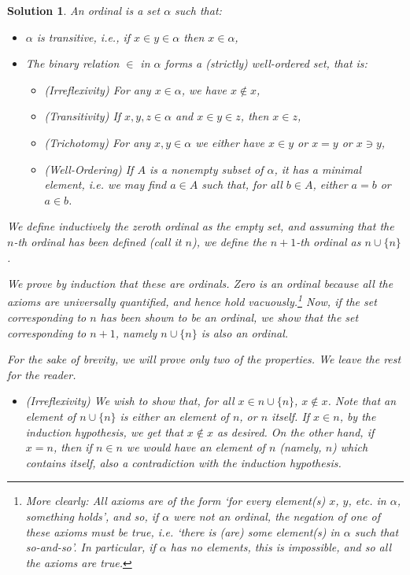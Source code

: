 \documentclass{article}
\theoremstyle{nonumberplain}
\newtheorem{sol}{Solution}
\begin{document}
\begin{sol}
An ordinal is a set $\alpha$ such that:
\begin{itemize}
\item $\alpha$ is transitive, i.e., if $x \in y \in \alpha$ then $x \in \alpha$,
\item The binary relation $\in$ in $\alpha$ forms a (strictly) well-ordered set, that is:
\begin{itemize}
\item (Irreflexivity) For any $x \in \alpha$, we have $x \notin x$,
\item (Transitivity) If $x,y,z \in \alpha$ and $x \in y \in z$, then $x \in z$,
\item (Trichotomy) For any $x, y \in \alpha$ we either have $x \in y$ or $x = y$ or $x \ni y$,
\item (Well-Ordering) If $A$ is a nonempty subset of $\alpha$, it has a minimal element, i.e. we may find $a \in A$ such that, for all $b \in A$, either $a = b$ or $a \in b$.
\end{itemize}
\end{itemize}

\smallskip

We define inductively the zeroth ordinal as the empty set, and assuming that the $n$-th ordinal has been defined (call it $n$), we define the $n+1$-th ordinal as $n \cup \{n\}$.

We prove by induction that these are ordinals. Zero is an ordinal because all the axioms are universally quantified, and hence hold vacuously.\footnote{More clearly: All axioms are of the form `for every element(s) $x$, $y$, etc. in $\alpha$, something holds', and so, if $\alpha$ were not an ordinal, the negation of one of these axioms must be true, i.e. `there is (are) some element(s) in $\alpha$ such that so-and-so'. In particular, if $\alpha$ has no elements, this is impossible, and so all the axioms are true.} Now, if the set corresponding to $n$ has been shown to be an ordinal, we show that the set corresponding to $n+1$, namely $n \cup \{n\}$ is also an ordinal.

For the sake of brevity, we will prove only two of the properties. We leave the rest for the reader.

\begin{itemize}
\item (Irreflexivity) We wish to show that, for all $x \in n \cup \{n\}$, $x \notin x$. Note that an element of $n \cup \{n\}$ is either an element of $n$, or $n$ itself. If $x \in n$, by the induction hypothesis, we get that $x \notin x$ as desired. On the other hand, if $x = n$, then if $n \in n$ we would have an element of $n$ (namely, $n$) which contains itself, also a contradiction with the induction hypothesis.


\end{itemize}
\end{sol}
\end{document}
